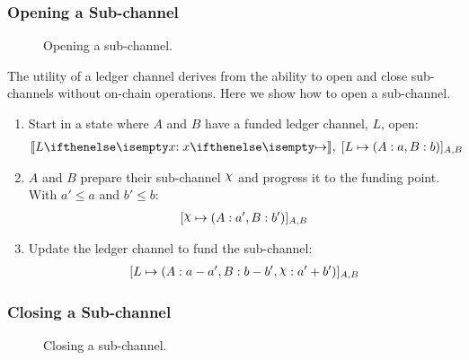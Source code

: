 \subsubsection{Opening a Sub-channel}

\begin{figure}[h]\centering
  \makebox[\textwidth][c]{}
  \caption{
    Opening a sub-channel.
  }\label{fig:opening-sub-channel}
\end{figure}

The utility of a ledger channel derives from the ability to open and close sub-channels without on-chain operations.
Here we show how to open a sub-channel.
\begin{enumerate}
  \item Start in a state where $A$ and $B$ have a funded ledger channel, $L$, open:
  \begin{align}
    \adj{\holds{L}{x}{}}, \; \finalizable{L}{\alloc{A: a, B: b}}{A, B}
  \end{align}
  \item $A$ and $B$ prepare their sub-channel $\rchi$ and progress it to the funding point. With $a' \leq a$ and $b' \leq b$:
  \begin{align}
    \finalizable{\rchi}{\alloc{A:a', B:b'}}{A,B}
  \end{align}
  \item Update the ledger channel to fund the sub-channel:
  \begin{align}
    \finalizable{L}{\alloc{A:a-a', B: b - b', \rchi: a' + b'}}{A,B}
  \end{align}
\end{enumerate}

\subsubsection{Closing a Sub-channel}

\begin{figure}[h]\centering
  \makebox[\textwidth][c]{}
  \caption{
    Closing a sub-channel.
  }\label{fig:closing-sub-channel}
\end{figure}

